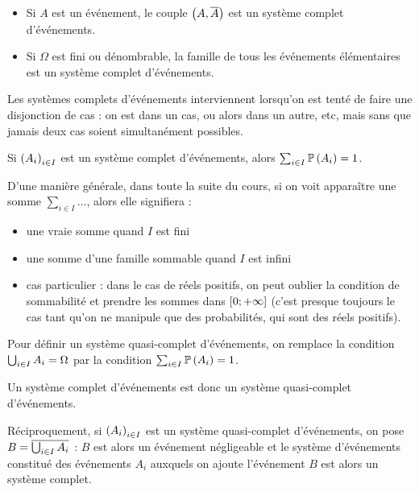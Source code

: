 \begin{ex}
\begin{itemize}
    \item Si \(A\) est un événement, le couple \(\left(A,\overline{A}\right)\) est un système complet d'événements. \\
    \item Si \(\Omega\) est fini ou dénombrable, la famille de tous les événements élémentaires est un système complet d'événements.
\end{itemize}
\end{ex}

Les systèmes complets d'événements interviennent lorsqu'on est tenté de faire une disjonction de cas : on est dans un cas, ou alors dans un autre, etc, mais sans que jamais deux cas soient simultanément possibles.

Si \(\left(A_i\right)_{i\in I}\) est un système complet d'événements, alors \(\sum_{i\in I}\mathbb{P}\left(A_i\right)=1\).

\begin{rem}
D'une manière générale, dans toute la suite du cours, si on voit apparaître une somme \(\sum_{i\in I}\dots\), alors elle signifiera :

\begin{itemize}
    \item une vraie somme quand \(I\) est fini \\
    \item une somme d'une famille sommable quand \(I\) est infini \\
    \item cas particulier : dans le cas de réels positifs, on peut oublier la condition de sommabilité et prendre les sommes dans \(\left[0;+\infty\right]\) (c'est presque toujours le cas tant qu'on ne manipule que des probabilités, qui sont des réels positifs).
\end{itemize}
\end{rem}

\begin{defi}
Pour définir un système quasi-complet d'événements, on remplace la condition \(\bigcup_{i\in I}A_i=\Omega\) par la condition \(\sum_{i\in I}\mathbb{P}\left(A_i\right)=1\).
\end{defi}

Un système complet d'événements est donc un système quasi-complet d'événements.

Réciproquement, si \(\left(A_i\right)_{i\in I}\) est un système quasi-complet d'événements, on pose \(B=\overline{\bigcup_{i\in I}A_i}\) : \(B\) est alors un événement négligeable et le système d'événements constitué des événements \(A_i\) auxquels on ajoute l'événement \(B\) est alors un système complet.

